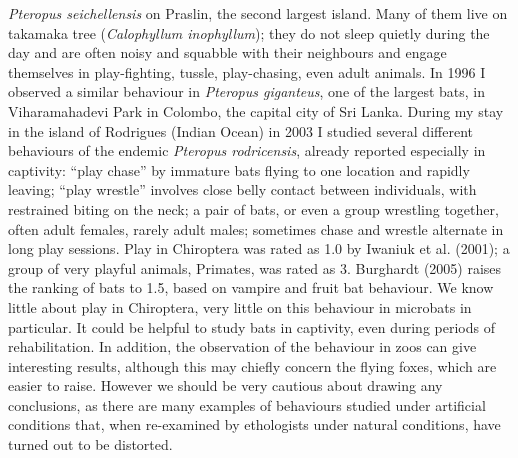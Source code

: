 {\emph{Pteropus seichellensis} on Praslin, the second largest island. Many of them live on takamaka tree (\emph{Calophyllum inophyllum}); they do not sleep quietly during the day and are often noisy and squabble with their neighbours and engage themselves in play-fighting, tussle, play-chasing, even adult animals. In 1996 I observed a similar behaviour in \emph{Pteropus giganteus}, one of the largest bats, in Viharamahadevi Park in Colombo, the capital city of Sri Lanka. During my stay in the island of Rodrigues (Indian Ocean) in 2003 I studied several different behaviours of the endemic \emph{Pteropus rodricensis}, already reported especially in captivity: ``play chase'' by immature bats flying to one location and rapidly leaving; ``play wrestle'' involves close belly contact between individuals, with restrained biting on the neck; a pair of bats, or even a group wrestling together, often adult females, rarely adult males; sometimes chase and wrestle alternate in long play sessions. Play in Chiroptera was rated as 1.0 by Iwaniuk et al. (2001); a group of very playful animals, Primates, was rated as 3. Burghardt (2005) raises the ranking of bats to 1.5, based on vampire and fruit bat behaviour. We know little about play in Chiroptera, very little on this behaviour in microbats in particular. It could be helpful to study bats in captivity, even during periods of rehabilitation. In addition, the observation of the behaviour in zoos can give interesting results, although this may chiefly concern the flying foxes, which are easier to raise. However we should be very cautious about drawing any conclusions, as there are many examples of behaviours studied under artificial conditions that, when re-examined by ethologists under natural conditions, have turned out to be distorted.} %